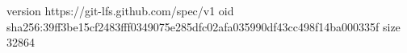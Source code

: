 version https://git-lfs.github.com/spec/v1
oid sha256:39ff3be15cf2483fff0349075e285dfc02afa035990df43cc498f14ba000335f
size 32864
